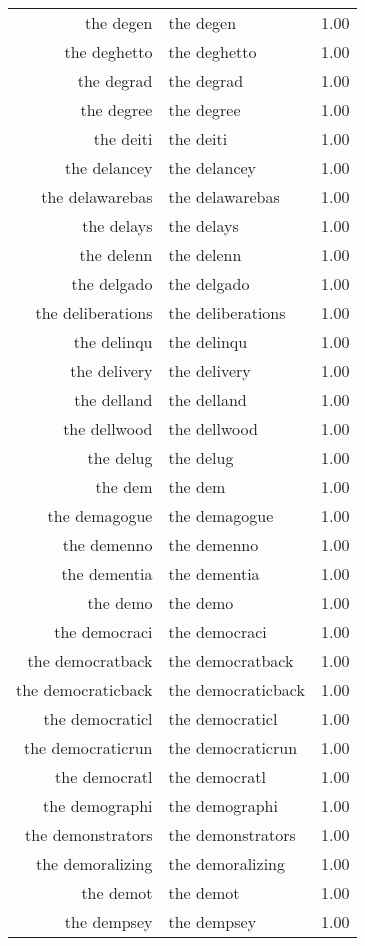 \begin{table}[ht]
\begin{tabular}{rlr}
  the degen & the degen & 1.00 \\ 
  the deghetto & the deghetto & 1.00 \\ 
  the degrad & the degrad & 1.00 \\ 
  the degree & the degree & 1.00 \\ 
  the deiti & the deiti & 1.00 \\ 
  the delancey & the delancey & 1.00 \\ 
  the delawarebas & the delawarebas & 1.00 \\ 
  the delays & the delays & 1.00 \\ 
  the delenn & the delenn & 1.00 \\ 
  the delgado & the delgado & 1.00 \\ 
  the deliberations & the deliberations & 1.00 \\ 
  the delinqu & the delinqu & 1.00 \\ 
  the delivery & the delivery & 1.00 \\ 
  the delland & the delland & 1.00 \\ 
  the dellwood & the dellwood & 1.00 \\ 
  the delug & the delug & 1.00 \\ 
  the dem & the dem & 1.00 \\ 
  the demagogue & the demagogue & 1.00 \\ 
  the demenno & the demenno & 1.00 \\ 
  the dementia & the dementia & 1.00 \\ 
  the demo & the demo & 1.00 \\ 
  the democraci & the democraci & 1.00 \\ 
  the democratback & the democratback & 1.00 \\ 
  the democraticback & the democraticback & 1.00 \\ 
  the democraticl & the democraticl & 1.00 \\ 
  the democraticrun & the democraticrun & 1.00 \\ 
  the democratl & the democratl & 1.00 \\ 
  the demographi & the demographi & 1.00 \\ 
  the demonstrators & the demonstrators & 1.00 \\ 
  the demoralizing & the demoralizing & 1.00 \\ 
  the demot & the demot & 1.00 \\ 
  the dempsey & the dempsey & 1.00 \\ 

\end{tabular}
\end{table}
